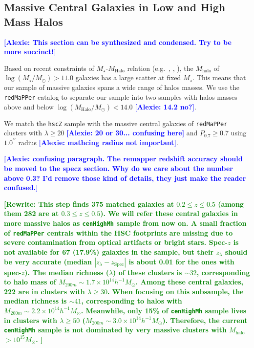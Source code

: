 \documentclass{emulateapj}
\def\arcsec{{\prime\prime}}
\def\redm{\texttt{redMaPPer}}
\def\rbcg{\texttt{cenHighMh}}
\def\mstar{{$M_{\star}$}}
\def\mhalo{{$M_{\mathrm{halo}}$}}
\def\logms{{$\log (M_{\star}/M_{\odot})$}}
\def\logmh{{$\log (M_{\mathrm{Halo}}/M_{\odot})$}}
\newcommand{\alexie}[1]{\textcolor{blue}{\textbf{[Alexie: #1]}}}
\newcommand{\rewrite}[1]{\textcolor{green}{\textbf{[Rewrite: #1]}}}
\begin{document}
\begin{CJK*}{UTF8}{gbsn}
 
\subsection{Massive Central Galaxies in Low and High Mass Halos}
    \label{ssec:mass_central}
    
    \alexie{This section can be synthesized and condensed. Try to be more succinct!}
    
    Based on recent constraints of $M_{\star}$-$M_{\mathrm{Halo}}$ relation 
    (e.g.\ \citealt{Leauthaud2012}, \citealt{Behroozi2013}, \citealt{Kravtsov2014}), 
    the \mhalo{} of \logms{}$ > 11.0$ galaxies has a large scatter at fixed \mstar{}. This means that our sample of massive galaxies spans a wide range of halos masses. We use the \redm{} catalog to separate our sample into two samples with halos masses above and below \logmh{}$<14.0$ \alexie{14.2 no?}.
    
    
   We match the \texttt{hscZ} sample with the massive central galaxies of 
    \redm{} clusters with $\lambda \geq 20$ \alexie{20 or 30... confusing here} and $P_{\mathrm{0.7}} \geq 0.7$ using 
    $1.0^{\arcsec}$ radius \alexie{mathcing radius not important}.
    
     \alexie{confusing paragraph. The remapper redshift accuracy should be moved to the specz section. Why do we care about the number above 0.3? I'd remove those kind of details, they just make the reader confused.}
     
    \rewrite{This step finds 375 matched galaxies at $0.2 \leq z \leq 0.5$ 
    (among them 282 are at $0.3 \leq z \leq 0.5$).  
    We will refer these \textbf{central galaxies in more massive halos} as \rbcg{} 
    sample from now on.
    A small fraction of \redm{} centrals within the HSC footprints are missing  
    due to severe contamination from optical artifacts or bright stars.
    Spec-$z$ is not available for 67 (17.9\%) galaxies in the sample, but their 
    $z_{\lambda}$ should be very accurate (median $|z_{\lambda} - z_{\mathrm{Spec}}|$ is 
    about 0.01 for the ones with spec-$z$).
    The median richness ($\lambda$) of these clusters is $\sim 32$, corresponding to 
    halo mass of $M_{200m}\sim 1.7\times 10^{14} h^{-1} M_{\odot}$. 
    Among these central galaxies, 222 are in clusters with $\lambda \geq 30$. 
    When focusing on this subsample, the median richness is $\sim 41$, corresponding 
    to halos with $M_{200m} \sim 2.2\times 10^{14} h^{-1} M_{\odot}$. 
    Meanwhile, only 15\% of \rbcg{} sample lives in clusters with $\lambda \geq 50$
    ($M_{200m} \sim 3.0\times 10^{14} h^{-1} M_{\odot}$).   
    Therefore, the current \rbcg{} sample is not dominated by very massive clusters 
    with \mhalo{}$>10^{15} M_{\odot}$.  }
    

\end{CJK*}
\end{document}
